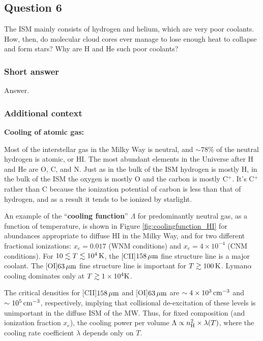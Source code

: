 \documentclass[a4paper,10pt]{article}
\begin{document}
\newpage
\subsection{Question 6}

The ISM mainly consists of hydrogen and helium, which are very poor coolants. How, then, do molecular cloud cores ever manage to lose enough heat to collapse and form stars? Why are H
and He such poor coolants?

\subsubsection{Short answer}

Answer.

\subsubsection{Additional context}

{\noindent}\textbf{Cooling of atomic gas:}

{\noindent}Most of the interstellar gas in the Milky Way is neutral, and $\sim78\%$ of the neutral hydrogen is atomic, or HI. The most abundant elements in the Universe after H and He are O, C, and N. Just as in the bulk of the ISM hydrogen is mostly H, in the bulk of the ISM the oxygen is mostly O and the carbon is mostly C$^+$. It's C$^+$ rather than C because the ionization potential of carbon is less than that of hydrogen, and as a result it tends to be ionized by starlight.

{\noindent}An example of the ``\textbf{cooling function}'' $\Lambda$ for predominantly neutral gas, as a function of temperature, is shown in Figure \ref{fig:coolingfunction_HI} for abundances appropriate to diffuse HI in the Milky Way, and for two different fractional ionizations: $x_e=0.017$ (WNM conditions) and $x_e=4\times10^{-4}$ (CNM conditions). For $10\lesssim T\lesssim10^4\,{\rm K}$, the [CII]$158\,\mu{\rm m}$ fine structure line is a major coolant. The [OI]$63\,\mu{\rm m}$ fine structure line is important for $T\gtrsim100\,{\rm K}$. Lyman$\alpha$ cooling dominates only at $T\gtrsim1\times10^4{\rm K}$. 

{\noindent}The critical densities for [CII]$158\,\mu{\rm m}$ and [OI]$63\,\mu{\rm m}$ are $\sim4\times10^3\,{\rm cm^{-3}}$ and $\sim10^5\,{\rm cm^{-3}}$, respectively, implying that collisional de-excitation of these levels is unimportant in the diffuse ISM of the MW. Thus, for fixed composition (and ionization fraction $x_e$), the cooling power per volume $\Lambda\propto n_{\rm H}^2\times\lambda(T)$, where the cooling rate coefficient $\lambda$ depends only on $T$.
\end{document}
